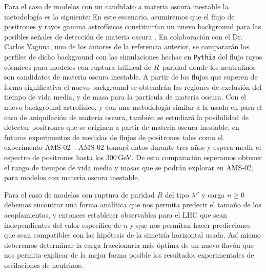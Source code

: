 Para el caso de modelos con un candidato a materia oscura inestable la metodología es la siguiente:
En este escenario, asumiremos que el flujo de positrones y rayos gamma astrofísicos constituirían un nuevo background para las posibles señales de detección de materia oscura \cite{Choi:2009qc}. En colaboración con el Dr. Carlos Yaguna, uno de los autores de la referencia anterior, se compararán los perfiles de dicho background  con las simulaciones hechas en \texttt{Pythia} \cite{Sjostrand:2006za} del flujo rayos cósmicos para modelos con ruptura trilineal de $R$--paridad donde los neutralinos son candidatos de materia oscura inestable. A partir de los flujos que superen de forma significativa el nuevo background se obtendrán las regiones de exclusión del  tiempo de vida media, y de masa para la partícula de materia oscura. Con el nuevo background  astrofísico, y con una metodología similar a la usada en \cite{Choi:2009qc} para  el caso de aniquilación de materia oscura, también se estudiará la posibilidad de detectar positrones que se originen a partir de materia oscura inestable, en futuros experimentos de medidas de flujos de positrones tales como el experimento AMS-02~\cite{ams:2009}. AMS-02 tomará datos durante tres años y espera medir el espectro de positrones hasta los $300\,$GeV. De esta comparación esperamos obtener el rango de tiempos de vida media y masas que se podrán explorar en AMS-02, para modelos con materia oscura inestable.


Para el caso de modelos con ruptura de paridad $R$ del tipo $\lambda''$ y carga $n\ge 0$ debemos encontrar una forma analítica que nos permita predecir el tamaño de los acoplamientos, y entonces establecer observables para el LHC que sean independientes del valor específico de $n$ y que nos permitan hacer predicciones que sean compatibles con las hipótesis de la simetría horizontal usada. Así mismo deberemos determinar la carga fraccionaria más óptima de un nuevo flavón que nos permita explicar de la mejor forma posible los resultados experimentales de oscilaciones de neutrinos.



